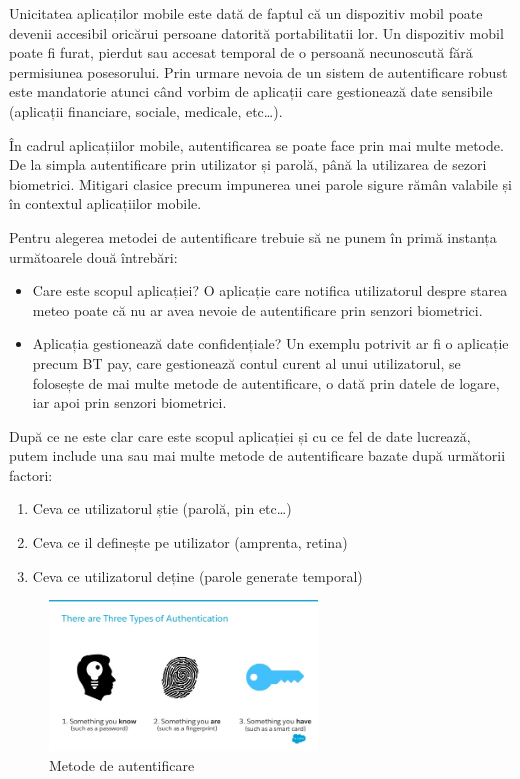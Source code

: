 \documentclass[12pt]{article}
\begin{document}
Unicitatea aplicaților mobile este dată de faptul că un dispozitiv mobil
poate devenii accesibil oricărui persoane datorită portabilitatii lor. Un dispozitiv mobil
poate fi furat, pierdut sau accesat temporal de o persoană necunoscută fără permisiunea
posesorului. Prin urmare nevoia de un sistem de autentificare robust este mandatorie 
atunci când vorbim de aplicații care gestionează date sensibile (aplicații financiare, sociale,
medicale, etc\dots).

\bigskip

În cadrul aplicațiilor mobile, autentificarea se poate face prin mai multe metode. De la
simpla autentificare prin utilizator și parolă, până la utilizarea de sezori biometrici.
Mitigari clasice precum impunerea unei parole sigure rămân valabile și în 
contextul aplicațiilor mobile.


Pentru alegerea metodei de autentificare trebuie să ne punem în primă instanța următoarele două
întrebări:

\begin{itemize}
    \item Care este scopul aplicației? O aplicație care notifica utilizatorul despre starea meteo poate 
    că nu ar avea nevoie de autentificare prin senzori biometrici. 
    \item Aplicația gestionează date confidențiale? Un exemplu potrivit ar fi o aplicație precum BT pay, care gestionează 
    contul curent al unui utilizatorul,
    se folosește de mai multe metode de autentificare, o dată prin datele de logare, iar apoi
    prin senzori biometrici.
\end{itemize}

După ce ne este clar care este scopul aplicației și cu ce fel de date lucrează, 
putem include una sau mai multe metode de autentificare bazate după următorii
factori:

\begin{enumerate}
    \item Ceva ce utilizatorul știe (parolă, pin etc\dots)
    \item Ceva ce il definește pe utilizator (amprenta, retina)
    \item Ceva ce utilizatorul deține (parole generate temporal)
\end{enumerate}

\begin{figure}[H]
\centering
\includegraphics[height=4cm]{3ways.jpg}
\caption{Metode de autentificare \cite{3ways-auth}}
\end{figure}
\end{document}
